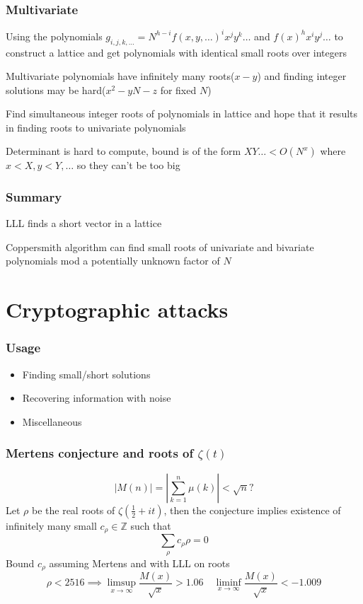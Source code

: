 \documentclass{beamer}
\begin{document}
\begin{frame}
    \frametitle{Multivariate}
    Using the polynomials $g_{i,j,k,\dots}=N^{h-i}f(x,y,\dots)^ix^jy^k\dots$ and $f(x)^hx^iy^j\dots$ to construct a lattice and get polynomials with identical small roots over integers\pause

    Multivariate polynomials have infinitely many roots($x-y$) and finding integer solutions may be hard($x^2-yN-z$ for fixed $N$)\pause

    Find simultaneous integer roots of polynomials in lattice and hope that it results in finding roots to univariate polynomials\pause

    Determinant is hard to compute, bound is of the form $XY\dots<O\left(N^x\right)$ where $x<X,y<Y,\dots$ so they can't be too big
\end{frame}

\begin{frame}
    \frametitle{Summary}
    LLL finds a short vector in a lattice\pause

    Coppersmith algorithm can find small roots of univariate and bivariate polynomials mod a potentially unknown factor of $N$
\end{frame}

\section{Cryptographic attacks}

\begin{frame}
    \frametitle{Usage}
    \begin{itemize}
        \item Finding small/short solutions
        \item Recovering information with noise
        \item Miscellaneous
    \end{itemize}
\end{frame}

\begin{frame}
    \frametitle{Mertens conjecture and roots of $\zeta(t)$}
    $$|M(n)|=\left|\sum_{k=1}^n\mu(k)\right|<\sqrt{n}?$$\pause
    Let $\rho$ be the real roots of $\zeta\left(\frac12+it\right)$, then the conjecture implies existence of infinitely many small $c_\rho\in\mathbb Z$ such that 
    $$\sum_\rho c_\rho\rho=0$$\pause
    Bound $c_\rho$ assuming Mertens and with LLL on roots
    $$\rho<2516\implies\limsup_{x\to\infty}\frac{M(x)}{\sqrt x}>1.06\quad\liminf_{x\to\infty}\frac{M(x)}{\sqrt x}<-1.009$$
\end{frame}
\end{document}
